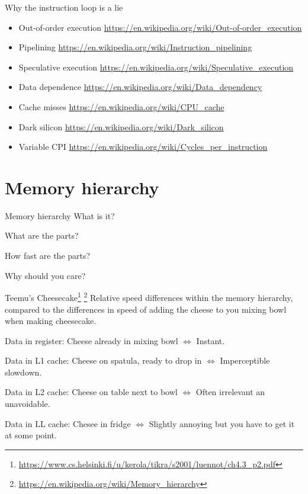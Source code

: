 \documentclass[11pt, aspectratio=169, table]{beamer}
\begin{document}
\begin{frame}{Why the instruction loop is a lie}
\pause
\begin{itemize}
\item \alert{Out-of-order execution} \url{https://en.wikipedia.org/wiki/Out-of-order_execution}
\item \alert{Pipelining} \url{https://en.wikipedia.org/wiki/Instruction_pipelining}
\item \alert{Speculative execution} \url{https://en.wikipedia.org/wiki/Speculative_execution}
\item \alert{Data dependence} \url{https://en.wikipedia.org/wiki/Data_dependency}
\item \alert{Cache misses} \url{https://en.wikipedia.org/wiki/CPU_cache}
\item \alert{Dark silicon} \url{https://en.wikipedia.org/wiki/Dark_silicon}
\item \alert{Variable CPI} \url{https://en.wikipedia.org/wiki/Cycles_per_instruction}
\end{itemize}
\end{frame}

\section{Memory hierarchy}
\begin{frame}{Memory hierarchy}
\setlength{\parskip}{\fill}
What is it?

What are the parts?

How fast are the parts?

Why should \alert{you} care?
\end{frame}

\begin{frame}{Teemu's Cheesecake\footnote{\url{https://www.cs.helsinki.fi/u/kerola/tikra/s2001/luennot/ch4.3_p2.pdf}}
\footnote{\url{https://en.wikipedia.org/wiki/Memory_hierarchy}}}
Relative speed differences within the memory hierarchy, compared to the differences in speed of adding the cheese to you mixing bowl when making cheesecake.

\begin{description}[style=standard,leftmargin=*]
\item{\alert{Data in register: }} Cheese already in mixing bowl $\Leftrightarrow$ Instant.
\item{\alert{Data in L1 cache: }} Cheese on spatula, ready to drop in $\Leftrightarrow$ Imperceptible slowdown.
\item{\alert{Data in L2 cache: }} Cheese on table next to bowl $\Leftrightarrow$ Often irrelevant an unavoidable.
\item{\alert{Data in LL cache: }} Chesee in fridge $\Leftrightarrow$ Slightly annoying but you have to get it at some point.
\end{description}
\end{frame}
\end{document}

